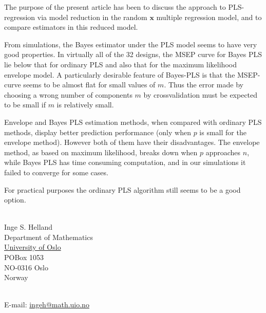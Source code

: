 \documentclass[a4paper, 11pt]{article}
\begin{document}
The purpose of the present article has been to discuss the approach to PLS-regression via model reduction in the random $\bm{x}$ multiple regression model, and to compare estimators in this reduced model.

From simulations, the Bayes estimator under the PLS model seems to have very good properties. In virtually all of the 32 designs, the MSEP curve for Bayes PLS lie below that for ordinary PLS and also that for the maximum likelihood envelope model. A particularly desirable feature of Bayes-PLS is that the MSEP-curve seems to be almost flat for small values of $m$. Thus the error made by choosing a wrong number of components $m$ by crossvalidation must be expected to be small if $m$ is relatively small.

Envelope and Bayes PLS estimation methods, when compared with ordinary PLS methods, display better prediction performance (only when $p$ is small for the envelope method). However both of them have their disadvantages. The envelope method, as based on maximum likelihood, breaks down when $p$ approaches $n$, while Bayes PLS has time consuming computation, and in our simulations it failed to converge for some cases.

For practical purposes the ordinary PLS algorithm still seems to be a good option.



\bigskip

\ \\
Inge S. Helland \\
Department of Mathematics \\
\href{http://uio.no}{University of Oslo} \\
POBox 1053 \\
NO-0316 Oslo \\
Norway

\ \\
E-mail: \href{mailto:ingeh@math.uio.no}{ingeh@math.uio.no}
\end{document}

